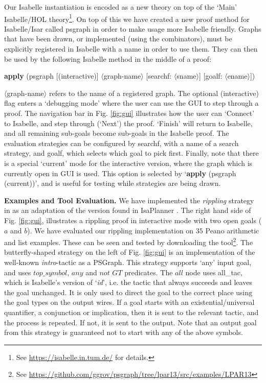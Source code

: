 \documentclass{llncs}
\begin{document}
Our Isabelle instantiation is encoded as a new theory on top of the 
`Main' Isabelle/HOL theory\footnote{See \url{https://isabelle.in.tum.de/} for details.}. On top of this we have created a new proof method for Isabelle/Isar called
\textsf{psgraph} in order to make usage more Isabelle friendly. Graphs that
have been drawn, or implemented (using the combinators), must be 
explicitly registered in Isabelle with a name in order to use them.
They can then be used by the following Isabelle method in the middle of a proof:
\begin{center}\sf
\textbf{apply} (psgraph [(interactive)] $\langle$graph-name$\rangle$ [searchf: $\langle$sname$\rangle$]  [goalf: $\langle$ename$\rangle$])
\end{center}
\textsf{$\langle$graph-name$\rangle$} refers to the name of a registered graph.
The optional \textsf{(interactive)} flag enters a `debugging mode' where the user can use the GUI to step through a proof. The navigation bar in Fig. \ref{fig:gui} illustrates how the user can `Connect' to Isabelle, and step through (`Next') the proof. `Finish' will return to Isabelle, and all remaining sub-goals 
become sub-goals in the Isabelle proof. The evaluation strategies can be configured by \textsf{searchf}, with a name of a search strategy, and \textsf{goalf}, which selects
which goal to pick first. Finally, note that there is a special `current' mode for the interactive version, where the graph which is currently open in GUI is used. This option is selected by  `\textsf{\textbf{apply} (psgraph (current))}', and is useful for testing while strategies are being drawn. 

\vspace{10pt}

\noindent \textbf{Examples and Tool Evaluation.}
We have implemented the \emph{rippling} strategy in \psgraphtool{} as an 
adaptation of the version found in IsaPlanner \cite{paper:Dixon:03}. The right
hand side of Fig. \ref{fig:gui}, illustrates a rippling proof in interactive mode
with two open goals ($a$ and $b$). We have evaluated our rippling implementation
on $35$ Peano arithmetic and list examples. These can be seen and tested
by downloading the tool\footnote{See \url{https://github.com/ggrov/psgraph/tree/lpar13/src/examples/LPAR13}}. 
The butterfly-shaped strategy on the left of Fig. \ref{fig:gui} is an implementation of the well-known \emph{intro}-tactic as a PSGraph. This strategy supports `any' input goal, and uses $top\_symbol$, $any$ and $not$ $GT$ predicates. 
The $all$ node uses \textsf{all\_tac}, which is Isabelle's version of `\textit{id}', i.e. the tactic that 
always succeeds and leaves the goal unchanged. It is only used to direct the goal to the correct place using the goal types on the output wires. If a goal starts with 
an existential/universal quantifier, a conjunction or implication, then it is sent to the relevant tactic, and the process is repeated. If not, it is sent to the output. Note that an output goal from this strategy is guaranteed not to start with any of the above symbols.
\end{document}
